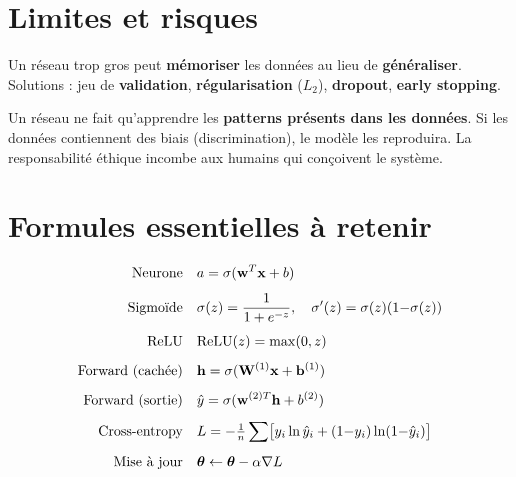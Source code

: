 \section{Limites et risques}

\begin{attentionbox}
    Un r\'{e}seau trop gros peut \textbf{m\'{e}moriser} les donn\'{e}es au lieu de \textbf{g\'{e}n\'{e}raliser}.
    Solutions : jeu de \textbf{validation}, \textbf{r\'{e}gularisation} ($L_2$), \textbf{dropout},
    \textbf{early stopping}.
\end{attentionbox}

\begin{attentionbox}
    Un r\'{e}seau ne fait qu'apprendre les \textbf{patterns pr\'{e}sents dans les donn\'{e}es}.
    Si les donn\'{e}es contiennent des biais (discrimination), le mod\`{e}le les reproduira.
    La responsabilit\'{e} \'{e}thique incombe aux humains qui con\c{c}oivent le syst\`{e}me.
\end{attentionbox}

\section{Formules essentielles \`{a} retenir}

\begin{tcolorbox}[
    enhanced, colback=ipssiBleu!3, colframe=ipssiBleu!40, boxrule=1pt, arc=4pt,
    title={\sffamily\bfseries Formules du Jour 4}, coltitle=white, colbacktitle=ipssiBleu!70,
]
\begin{align}
    \text{Neurone}\quad
        & a = \sigma(\vw^T \vx + b)
        \label{eq:f-neurone} \\[4pt]
    \text{Sigmo\"{\i}de}\quad
        & \sigma(z) = \frac{1}{1 + e^{-z}}, \quad \sigma'(z) = \sigma(z)(1{-}\sigma(z))
        \label{eq:f-sigmoid} \\[4pt]
    \text{ReLU}\quad
        & \text{ReLU}(z) = \max(0, z)
        \label{eq:f-relu} \\[4pt]
    \text{Forward (cach\'{e}e)}\quad
        & \mathbf{h} = \sigma(\mathbf{W}^{(1)} \vx + \mathbf{b}^{(1)})
        \label{eq:f-fwd1} \\[4pt]
    \text{Forward (sortie)}\quad
        & \yhat = \sigma(\mathbf{w}^{(2)T} \mathbf{h} + b^{(2)})
        \label{eq:f-fwd2} \\[4pt]
    \text{Cross-entropy}\quad
        & L = -\tfrac{1}{n}\sum\bigl[y_i\ln\yhat_i + (1{-}y_i)\ln(1{-}\yhat_i)\bigr]
        \label{eq:f-ce} \\[4pt]
    \text{Mise \`{a} jour}\quad
        & \boldsymbol{\theta} \leftarrow \boldsymbol{\theta} - \alpha \nabla L
        \label{eq:f-update}
\end{align}
\end{tcolorbox}

